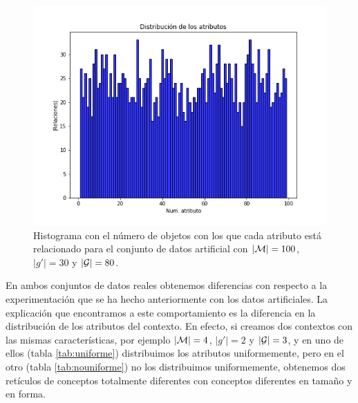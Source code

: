 \documentclass[oneside,openright,titlepage,numbers=noenddot,openany,headinclude,footinclude=true,
cleardoublepage=empty,abstractoff,BCOR=5mm,paper=a4,fontsize=12pt,main=spanish]{scrreprt}
\begin{document}
\begin{figure}[H]
  \centering
  \includegraphics[scale=0.5]{images/distribution-artificialg30G80.png}
\caption{Histograma con el número de objetos con los que cada atributo está relacionado para el conjunto de datos artificial con $|\mathcal{M}|=100$, $|g'|=30$ y $|\mathcal{G}|=80$.}
 \label{fig:distrartg30G80}
\end{figure}

En ambos conjuntos de datos reales obtenemos diferencias con respecto a la experimentación que se ha hecho anteriormente con los datos artificiales. La explicación que encontramos a este comportamiento es la diferencia en la distribución de los atributos del contexto. En efecto, si creamos dos contextos con las mismas características, por ejemplo $|\mathcal{M}|=4$, $|g'|=2$ y $|\mathcal{G}|=3$, y en uno de ellos (tabla \ref{tab:uniforme}) distribuimos los atributos uniformemente, pero en el otro (tabla \ref{tab:nouniforme}) no los distribuimos uniformemente, obtenemos dos retículos de conceptos totalmente diferentes con conceptos diferentes en tamaño y en forma.
\end{document}

